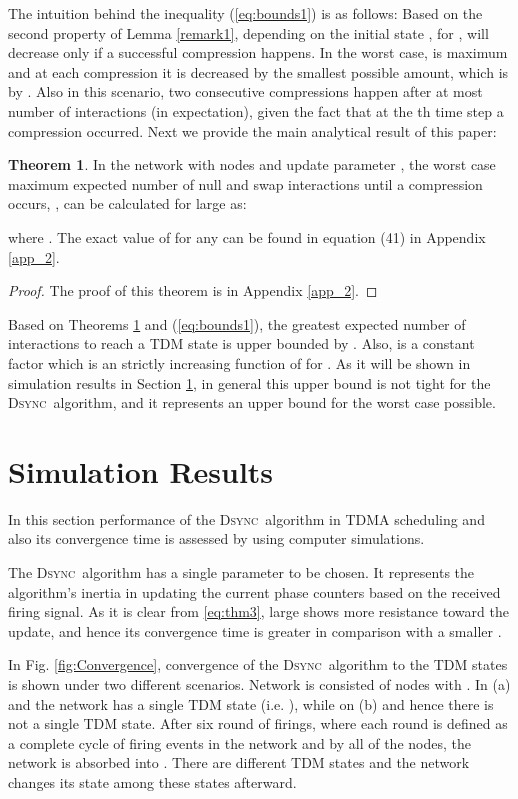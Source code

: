\documentclass[conference]{IEEEtran}
\newcommand{\DDD}{\textsc{Dsync~}}
\theoremstyle{definition}
\theoremstyle{definition}
\newtheorem{theorem}{Theorem}
\begin{document}
The intuition behind the inequality (\ref{eq:bounds1}) is as follows: Based on the second property of Lemma \ref{remark1}, depending on the initial state ,  for ,   will decrease only if a successful compression happens. In the worst case,  is maximum and at each compression it is decreased by the smallest possible amount, which is by . Also in this scenario, two consecutive compressions  happen after at most  number of interactions (in expectation), given the fact that at the th time step a compression occurred. Next we provide the main analytical result of this paper:
\begin{theorem}\label{thm:timebound}
In the network  with  nodes and update parameter , the worst case maximum expected number of null and swap interactions until a compression occurs, , can be calculated for large  as:

where . The exact value of  for any  can be found in equation (41) in Appendix \ref{app_2}.
\end{theorem}
\begin{proof} The proof of this theorem is in Appendix \ref{app_2}.\end{proof}
Based on Theorems \ref{thm:timebound} and (\ref{eq:bounds1}), the greatest expected number of interactions to reach a TDM state  is upper bounded by . Also,  is a constant factor which is an strictly increasing function of  for . As it will be shown in simulation results in Section \ref{sec:sim}, in general this upper bound is not tight for the \DDD algorithm, and it represents an upper bound for the worst case possible.
\section{Simulation Results} \label{sec:sim}
In this section performance of the \DDD algorithm in TDMA scheduling and also its convergence time is assessed by using computer simulations.

The \DDD algorithm has a single parameter  to be chosen. It represents the algorithm's inertia in updating the current phase counters based on the received firing signal. As it is clear from \eqref{eq:thm3}, large  shows more resistance toward the update, and hence its convergence time is greater in comparison with a smaller .

In Fig. \ref{fig:Convergence}, convergence of the \DDD algorithm to the TDM states is shown under two different scenarios. Network  is consisted of  nodes with . In (a)  and the network has a single TDM state (i.e. ), while on (b)  and hence there is not a single TDM state. After six round of firings, where each round is defined as a complete cycle of firing events in the network and by all of the nodes, the network is absorbed into . There are  different TDM states and the network changes its state among these states afterward.
\end{document}
